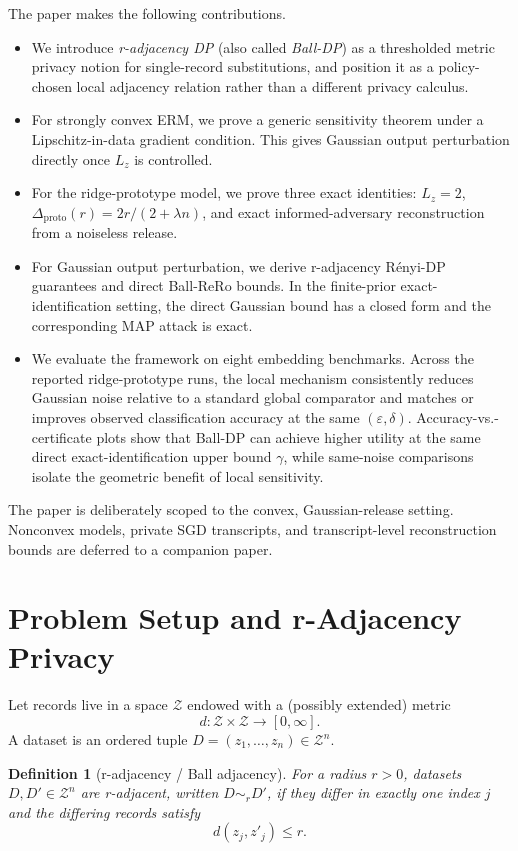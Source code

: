 \documentclass[conference,compsoc]{IEEEtran}
\newtheorem{definition}{Definition}
\begin{document}
The paper makes the following contributions.
\begin{itemize}[leftmargin=1.5em]
    \item We introduce \emph{r-adjacency DP} (also called \emph{Ball-DP}) as a thresholded metric privacy notion for single-record substitutions, and position it as a policy-chosen local adjacency relation rather than a different privacy calculus.
    \item For strongly convex ERM, we prove a generic sensitivity theorem under a Lipschitz-in-data gradient condition. This gives Gaussian output perturbation directly once $L_z$ is controlled.
    \item For the ridge-prototype model, we prove three exact identities: $L_z=2$, $\Delta_{\mathrm{proto}}(r)=2r/(2+\lambda n)$, and exact informed-adversary reconstruction from a noiseless release.
    \item For Gaussian output perturbation, we derive r-adjacency Rényi-DP guarantees and direct Ball-ReRo bounds. In the finite-prior exact-identification setting, the direct Gaussian bound has a closed form and the corresponding MAP attack is exact.
    \item We evaluate the framework on eight embedding benchmarks. Across the reported ridge-prototype runs, the local mechanism consistently reduces Gaussian noise relative to a standard global comparator and matches or improves observed classification accuracy at the same $(\varepsilon,\delta)$. Accuracy-vs.-certificate plots show that Ball-DP can achieve higher utility at the same direct exact-identification upper bound $\gamma$, while same-noise comparisons isolate the geometric benefit of local sensitivity.
\end{itemize}

The paper is deliberately scoped to the convex, Gaussian-release setting. Nonconvex models, private SGD transcripts, and transcript-level reconstruction bounds are deferred to a companion paper.

\section{Problem Setup and r-Adjacency Privacy}
\label{sec:setup}

Let records live in a space $\mathcal{Z}$ endowed with a (possibly extended) metric
\[
d:\mathcal{Z}\times\mathcal{Z}\to[0,\infty].
\]
A dataset is an ordered tuple $D=(z_1,\dots,z_n)\in\mathcal{Z}^n$.

\begin{definition}[r-adjacency / Ball adjacency]
For a radius $r>0$, datasets $D,D'\in\mathcal{Z}^n$ are \emph{r-adjacent}, written $D\sim_r D'$, if they differ in exactly one index $j$ and the differing records satisfy
\[
d(z_j,z'_j)\le r.
\]
\end{definition}
\end{document}

